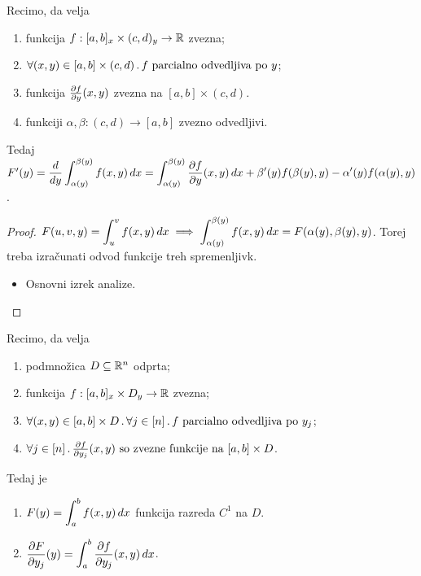 \begin{posledica}
    Recimo, da velja
    \begin{enumerate}
        \item funkcija $f:[a,b]_x \times (c,d)_y \to \mathbb{R}$ zvezna;
        \item $\forall (x,y) \in [a,b] \times (c,d) \,.\, f \text{ parcialno odvedljiva po } y$;
        \item funkcija $\frac{\partial f}{\partial y}(x,y)$ zvezna na $[a,b] \times (c,d)$.
        \item funkciji $\alpha, \beta: (c,d) \to [a,b]$ zvezno odvedljivi.
    \end{enumerate}
    Tedaj $F'(y) = \displaystyle \frac{d}{dy} \int_{\alpha(y)}^{\beta(y)}f(x,y) \, dx = \int_{\alpha(y)}^{\beta(y)} \frac{\partial f}{\partial y}(x,y) \, dx + \beta'(y)f(\beta(y), y) - \alpha'(y)f(\alpha(y), y)$.
\end{posledica}

\begin{proof}
    $\displaystyle F(u,v,y) = \int_{u}^{v}f(x,y) \, dx \implies \int_{\alpha(y)}^{\beta(y)} f(x,y)  \,dx = F(\alpha(y), \beta(y), y)$. Torej treba izračunati odvod funkcije treh spremenljivk. 
    \begin{itemize}
        \item Osnovni izrek analize. \qedhere
    \end{itemize}
\end{proof}

\begin{posledica}
    Recimo, da velja
    \begin{enumerate}
        \item podmnožica $D\subseteq \mathbb{R}^n$ odprta;
        \item funkcija $f: [a,b]_x \times D_y \to \mathbb{R}$ zvezna;
        \item $\forall (x,y) \in [a,b] \times D \,.\, \forall j \in [n] \,.\, f \text{ parcialno odvedljiva po } y_j$;
        \item $\forall j \in [n] \,.\, \frac{\partial f}{\partial y_j}(x,y) \text{ so zvezne funkcije na } [a,b] \times D$.
    \end{enumerate}
    Tedaj je 
    \begin{enumerate}
        \item $\displaystyle F(y) = \int_{a}^{b} f(x,y) \, dx $ funkcija razreda $C^1$ na $D$.
        \item $\displaystyle \frac{\partial F}{\partial y_j}(y) = \int_{a}^{b} \frac{\partial f}{\partial y_j}(x,y) \, dx$.
    \end{enumerate}    
\end{posledica}

